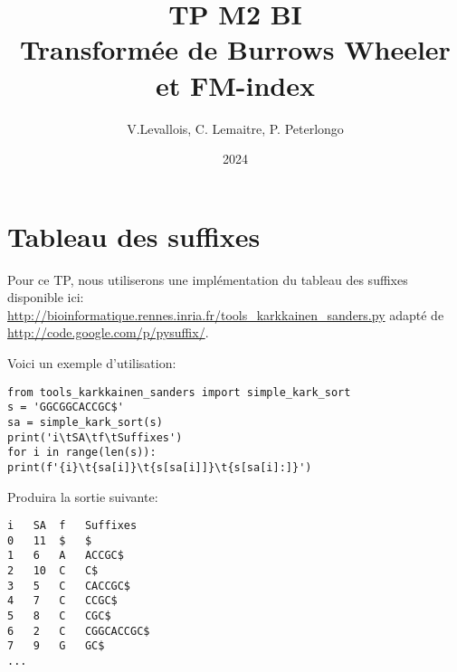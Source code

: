 
\usepackage{array}
\usepackage{url}
\usepackage{moreverb}
\usepackage{verbatim}
\usepackage{hyperref}

\usepackage{minted}

\newcommand{\sligne}{\begin{center} \begin{tabular}{c}~~~~~~~~~~~~~~~~~~~~~~~~~~~~~~~~~~~~~~\\ \hline\\\end{tabular}\end{center}}

\title{TP M2 BI \\ Transformée de Burrows Wheeler et FM-index}
\date{2024}
\author{V.Levallois, C. Lemaitre, P. Peterlongo}
\maketitle



\section*{Tableau des suffixes}\label{sec:tableau_des_suffixes}

Pour ce TP, nous utiliserons une implémentation du tableau des suffixes disponible ici:
\url{http://bioinformatique.rennes.inria.fr/tools_karkkainen_sanders.py} adapté de \url{http://code.google.com/p/pysuffix/}.



Voici un exemple d'utilisation:

\begin{verbatim}
from tools_karkkainen_sanders import simple_kark_sort
s = 'GGCGGCACCGC$'
sa = simple_kark_sort(s)
print('i\tSA\tf\tSuffixes')
for i in range(len(s)): print(f'{i}\t{sa[i]}\t{s[sa[i]]}\t{s[sa[i]:]}')
\end{verbatim}

\noindent Produira la sortie suivante:
\begin{verbatim}
i	SA	f	Suffixes
0	11	$	$
1	6	A	ACCGC$
2	10	C	C$
3	5	C	CACCGC$
4	7	C	CCGC$
5	8	C	CGC$
6	2	C	CGGCACCGC$
7	9	G	GC$
...
\end{verbatim}

